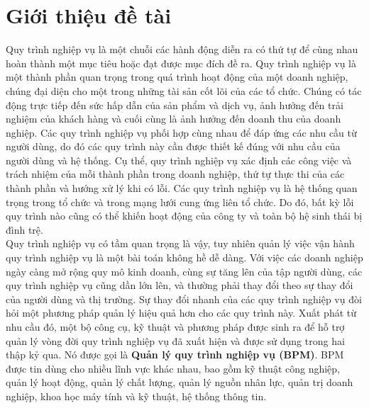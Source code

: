 
\section{Giới thiệu đề tài}

\hspace{0.5cm}Quy trình nghiệp vụ là một chuỗi các hành động diễn ra có thứ tự để cùng nhau hoàn thành một mục tiêu hoặc đạt được mục đích đề ra. Quy trình nghiệp vụ là một thành phần quan trọng trong quá trình hoạt động của một doanh nghiệp, chúng đại diện cho một trong những tài sản cốt lõi của các tổ chức. Chúng có tác động trực tiếp đến sức hấp dẫn của sản phẩm và dịch vụ, ảnh hưởng đến trải nghiệm của khách hàng và cuối cùng là ảnh hưởng đến doanh thu của doanh nghiệp. Các quy trình nghiệp vụ phối hợp cùng nhau để đáp ứng các nhu cầu từ người dùng, do đó các quy trình này cần được thiết kế đúng với nhu cầu của người dùng và hệ thống. Cụ thể, quy trình nghiệp vụ xác định các công việc và trách nhiệm của mỗi thành phần trong doanh nghiệp, thứ tự thực thi của các thành phần và hướng xử lý khi có lỗi. Các quy trình nghiệp vụ là hệ thống quan trọng trong tổ chức và trong mạng lưới cung ứng liên tổ chức. Do đó, bất kỳ lỗi quy trình nào cũng có thể khiến hoạt động của công ty và toàn bộ hệ sinh thái bị đình trệ.\\

Quy trình nghiệp vụ có tầm quan trọng là vậy, tuy nhiên quản lý việc vận hành quy trình nghiệp vụ là một bài toán không hề dễ dàng. Với việc các doanh nghiệp ngày càng mở rộng quy mô kinh doanh, cùng sự tăng lên của tập người dùng, các quy trình nghiệp vụ cũng dần lớn lên, và thường phải thay đổi theo sự thay đổi của người dùng và thị trường. Sự thay đổi nhanh của các quy trình nghiệp vụ đòi hỏi một phương pháp quản lý hiệu quả hơn cho các quy trình này. Xuất phát từ nhu cầu đó, một bộ công cụ, kỹ thuật và phương pháp được sinh ra để hỗ trợ quản lý vòng đời quy trình nghiệp vụ đã xuất hiện và được sử dụng trong hai thập kỷ qua. Nó được gọi là \textbf{Quản lý quy trình nghiệp vụ (BPM)}. BPM được tin dùng cho nhiều lĩnh vực khác nhau, bao gồm kỹ thuật công nghiệp, quản lý hoạt động, quản lý chất lượng, quản lý nguồn nhân lực, quản trị doanh nghiệp, khoa học máy tính và kỹ thuật, hệ thống thông tin.\\

